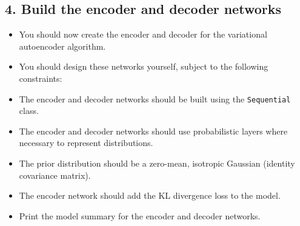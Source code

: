 \documentclass[11pt]{article}
\providecommand{\tightlist}{%
      \setlength{\itemsep}{0pt}\setlength{\parskip}{0pt}}
\newcommand{\prompt}[4]{
        \llap{{\color{#2}[#3]: #4}}\vspace{-1.25em}
    }
\begin{document}
    \begin{tcolorbox}[breakable, size=fbox, boxrule=1pt, pad at break*=1mm,colback=cellbackground, colframe=cellborder]
\prompt{In}{incolor}{ }{\hspace{4pt}}
\begin{Verbatim}[commandchars=\\\{\}]

\end{Verbatim}
\end{tcolorbox}

    \begin{tcolorbox}[breakable, size=fbox, boxrule=1pt, pad at break*=1mm,colback=cellbackground, colframe=cellborder]
\prompt{In}{incolor}{ }{\hspace{4pt}}
\begin{Verbatim}[commandchars=\\\{\}]

\end{Verbatim}
\end{tcolorbox}

    \begin{tcolorbox}[breakable, size=fbox, boxrule=1pt, pad at break*=1mm,colback=cellbackground, colframe=cellborder]
\prompt{In}{incolor}{ }{\hspace{4pt}}
\begin{Verbatim}[commandchars=\\\{\}]

\end{Verbatim}
\end{tcolorbox}

    \subsection{4. Build the encoder and decoder
networks}\label{build-the-encoder-and-decoder-networks}

\begin{itemize}
\tightlist
\item
  You should now create the encoder and decoder for the variational
  autoencoder algorithm.
\item
  You should design these networks yourself, subject to the following
  constraints:
\item
  The encoder and decoder networks should be built using the
  \texttt{Sequential} class.
\item
  The encoder and decoder networks should use probabilistic layers where
  necessary to represent distributions.
\item
  The prior distribution should be a zero-mean, isotropic Gaussian
  (identity covariance matrix).
\item
  The encoder network should add the KL divergence loss to the model.
\item
  Print the model summary for the encoder and decoder networks.
\end{itemize}
\end{document}
